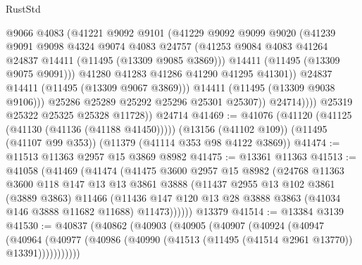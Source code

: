 \begin{lexlean}{RustStd}
\begin{coremodule}
                        @9066
                        @4083
                        (@41221
                          @9092
                          @9101
                          (@41229
                            @9092
                            @9099
                            @9020
                            (@41239
                              @9091
                              @9098
                              @4324
                              @9074
                              @4083
                              @24757
                              (@41253
                                @9084
                                @4083
                                @41264
                                @24837
                                @14411
                                (@11495 (@13309 @9085 @3869)))
                              @14411
                              (@11495 (@13309 @9075 @9091)))
                            @41280
                            @41283
                            @41286
                            @41290
                            @41295
                            @41301))
                        @24837
                        @14411
                        (@11495 (@13309 @9067 @3869)))
                      @14411
                      (@11495 (@13309 @9038 @9106)))
                    @25286
                    @25289
                    @25292
                    @25296
                    @25301
                    @25307))
                @24714))))
        @25319
        @25322
        @25325
        @25328
        @11728))
    @24714
@41469 := @41076
    (@41120 (@41125 (@41130 (@41136 (@41188 @41450)))))
    (@13156 (@41102 @109))
    (@11495 (@41107 @99 @353))
    (@11379 (@41114 @353 @98 @4122 @3869))
@41474 := @11513 @11363 @2957 @15 @3869 @8982
@41475 := @13361 @11363
@41513 := @41058
    (@41469
      (@41474
        (@41475
          @3600
          @2957
          @15
          @8982
          (@24768
            @11363
            @3600
            @118
            @147
            @13
            @13
            @3861
            @3888
            (@11437
              @2955
              @13
              @102
              @3861
              (@3889 @3863)
              @11466
              (@11436 @147 @120 @13 @28 @3888 @3863 (@41034 @146 @3888 @11682 @11688) @11473))))))
    @13379
@41514 := @13384 @3139
@41530 := @40837
    (@40862
      (@40903
        (@40905
          (@40907
            (@40924
              (@40947
                (@40964
                  (@40977 (@40986 (@40990 (@41513 (@11495 (@41514 @2961 @13770)) @13391)))))))))))

\end{coremodule}
\end{lexlean}
